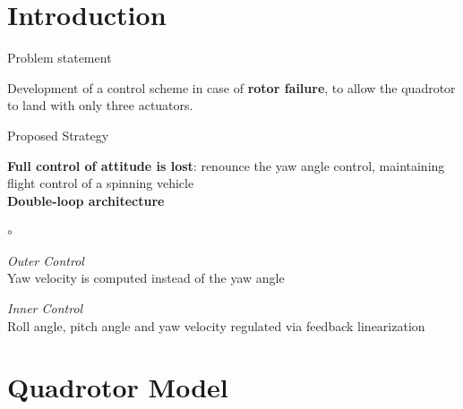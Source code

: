\section{Introduction}

\begin{frame}{Problem statement}

Development of a control scheme in case of \textbf{rotor failure}, to allow the quadrotor to land with only three actuators.

\end{frame}

\begin{frame}{Proposed Strategy}

\textbf{Full control of attitude is lost}: renounce the yaw angle control, maintaining flight control of a spinning vehicle\\
\bigskip
\textbf{Double-loop architecture}\\
\begin{list}{$ \circ $}{}
	\item \textit{Outer Control}\\
	Yaw velocity is computed instead of the yaw angle\\
	\bigskip
	\item \textit{Inner Control}\\
	Roll angle, pitch angle and yaw velocity regulated via feedback linearization
\end{list}

\end{frame}

\section{Quadrotor Model}


